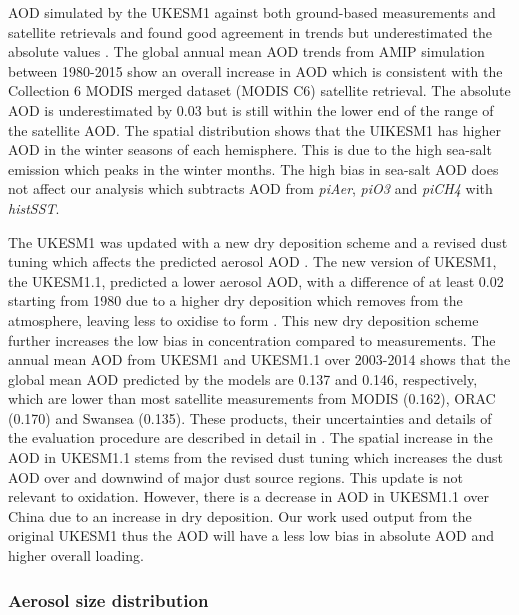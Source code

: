 AOD simulated by the UKESM1 against both ground-based measurements and satellite retrievals and found good agreement in trends but underestimated the absolute values \citep{mulcahyDescriptionEvaluationAerosol2020}. The global annual mean AOD trends from AMIP simulation between 1980-2015 show an overall increase in AOD which is consistent with the Collection 6 MODIS merged dataset (MODIS C6) satellite retrieval. The absolute AOD is underestimated by 0.03 but is still within the lower end of the range of the satellite AOD. The spatial distribution shows that the UIKESM1 has higher AOD in the winter seasons of each hemisphere. This is due to the high sea-salt emission which peaks in the winter months. The high bias in sea-salt AOD does not affect our analysis which subtracts AOD from \textit{piAer}, \textit{piO3} and \textit{piCH4} with \textit{histSST}.

The UKESM1 was updated with a new dry deposition scheme and a revised dust tuning which affects the predicted aerosol AOD \citep{mulcahyUKESM1DevelopmentEvaluation2022}. The new version of UKESM1, the UKESM1.1, predicted a lower aerosol AOD, with a difference of at least 0.02 starting from 1980 due to a higher  dry deposition which removes  from the atmosphere, leaving less to oxidise to form . This new dry deposition scheme further increases the low bias in  concentration compared to measurements. The annual mean AOD from UKESM1 and UKESM1.1 over 2003-2014 shows that the global mean AOD predicted by the models are 0.137 and 0.146, respectively, which are lower than most satellite measurements from MODIS (0.162), ORAC (0.170) and Swansea (0.135). These products, their uncertainties and details of the evaluation procedure are described in detail in \citet{mulcahyDescriptionEvaluationAerosol2020}. The spatial increase in the AOD in UKESM1.1 stems from the revised dust tuning which increases the dust AOD over and downwind of major dust source regions. This update is not relevant to  oxidation. However, there is a decrease in AOD in UKESM1.1 over China due to an increase in  dry deposition. Our work used output from the original UKESM1 thus the AOD will have a less low bias in absolute AOD and higher overall  loading.



\subsubsection{Aerosol size distribution}
\label{sec:ch3:result:aerosol-size-dist}

